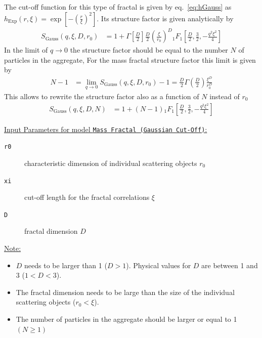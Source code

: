 The cut-off function for this type of fractal is given by eq.\ \ref{eq:hGauss} as
$h_\text{Exp}(r,\xi) = \exp\left[-\left(\tfrac{r}{\xi}\right)^2\right]$. Its structure factor is given analytically by
\begin{align}
S_\text{Gauss}(q,\xi,D,r_0) &= 1 +
    \Gamma\left[\tfrac{D}{2}\right]\frac{D}{2}
    \left(\frac{\xi}{r_0}\right)^D
    {}_1F_1\left[\tfrac{D}{2},\tfrac{3}{2},-\tfrac{q^2\xi^2}{4}\right]
\end{align}
In the limit of $q \to 0$ the structure factor should be equal to the number $N$ of particles in the aggregate, For the mass fractal structure factor this limit is given by
\begin{align}\label{eq:fractalGauss}
  N-1 & =\lim_{q\to 0}  S_\text{Gauss}(q,\xi,D,r_0)-1 = \frac{D}{2}\Gamma\left( \frac{D}{2} \right) \frac{\xi^D}{r_0^D}
\end{align}
This allows to rewrite the structure factor also as a function of $N$ instead of $r_0$
\begin{align}
S_\text{Gauss}(q,\xi,D,N) &= 1 +  (N-1) {}_1F_1\left[\tfrac{D}{2},\tfrac{3}{2},-\tfrac{q^2\xi^2}{4}\right]
\end{align}


\uline{Input Parameters for model \texttt{Mass Fractal (Gaussian Cut-Off)}:}
\begin{description}
\item[\texttt{r0}] characteristic dimension of individual scattering objects $r_0$
\item[\texttt{xi}] cut-off length for the fractal correlations $\xi$
\item[\texttt{D}] fractal dimension $D$
\end{description}

\uline{Note:}
\begin{itemize}
\item $D$ needs to be larger than 1 ($D>1$). Physical values for $D$ are between 1 and 3 ($1<D<3$).
\item The fractal dimension needs to be large than the size of the individual scattering objects ($r_0 < \xi$).
\item The number of particles in the aggregate should be larger or equal to 1 $(N\geq 1)$
\end{itemize}

